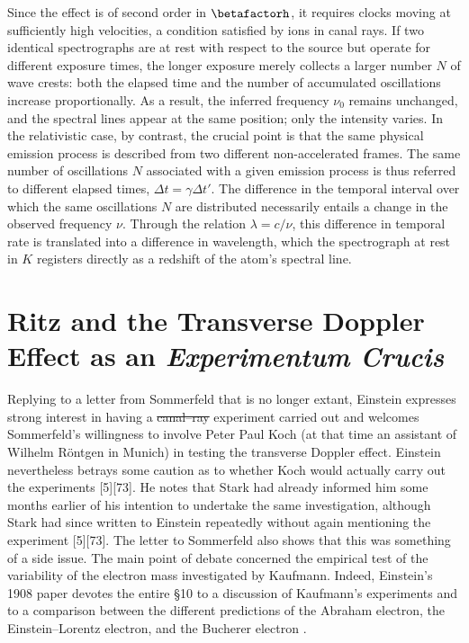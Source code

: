 \documentclass[submitted,12pt]{article} %
\newcommand{\tDe}{transverse Doppler effect\xspace}
\providecommand{\DIFadd}[1]{{\protect\color{blue}\uwave{#1}}} %
\providecommand{\DIFdel}[1]{{\protect\color{red}\sout{#1}}}                      %
\providecommand{\DIFaddbegin}{} %
\providecommand{\DIFaddend}{} %
\providecommand{\DIFdelbegin}{} %
\providecommand{\DIFdelend}{} %
\begin{document}
Since the effect is of second order in $\betafactorh$, it requires clocks moving at sufficiently high velocities, a condition satisfied by ions in canal rays. If two identical spectrographs are at rest with respect to the source but operate for different exposure times, the longer exposure merely collects a larger number $N$ of wave crests: both the elapsed time and the number of accumulated oscillations increase proportionally. As a result, the inferred frequency $\nu_0$ remains unchanged, and the spectral lines appear at the same position; only the intensity varies. In the relativistic case, by contrast, the crucial point is that the same physical emission process is described from two different non-accelerated frames. The same number of oscillations $N$ associated with a given emission process is thus referred to different elapsed times, $\Delta t=\gamma \Delta t'$. The difference in the temporal interval over which the same oscillations $N$ are distributed necessarily entails a change in the observed frequency $\nu$. Through the relation $\lambda = c/\nu$, this difference in temporal rate is translated into a difference in wavelength, which the spectrograph at rest in $K$ registers directly as a redshift of the atom’s spectral line.


\section{Ritz and the Transverse Doppler Effect as an \emph{Experimentum Crucis}}
%
Replying to a letter from Sommerfeld that is no longer extant, Einstein expresses strong interest in having a \DIFdelbegin \DIFdel{canal--ray }\DIFdelend \DIFaddbegin \DIFadd{canal-ray }\DIFaddend experiment carried out and welcomes Sommerfeld’s willingness to involve Peter Paul Koch (at that time an assistant of Wilhelm Röntgen in Munich) in testing the \tDe. Einstein nevertheless betrays some caution as to whether Koch would actually carry out the experiments [5][73]. He notes that Stark had already informed him some months earlier of his intention to undertake the same investigation, although Stark had since written to Einstein repeatedly without again mentioning the experiment [5][73]. The letter to Sommerfeld also shows that this was something of a side issue. The main point of debate concerned the empirical test of the variability of the electron mass investigated by Kaufmann. Indeed, Einstein’s 1908 paper devotes the entire \S10 to a discussion of Kaufmann’s experiments and to a comparison between the different predictions of the Abraham electron, the Einstein--Lorentz electron, and the Bucherer electron \citep{Walter2018}.
\end{document}
